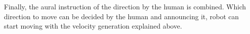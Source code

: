 
Finally, the aural instruction of the direction by the human is combined. Which direction to move can be decided by the human and announcing it, robot can start moving with the velocity generation explained above.

